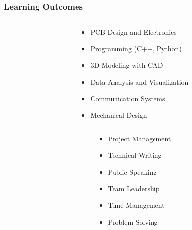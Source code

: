 \begin{frame}
\frametitle{Learning Outcomes}
\begin{columns}[T]
    \begin{column}{0.4\textwidth}
    \end{column}
    \begin{column}{0.6\textwidth}
        \begin{itemize}
            \item PCB Design and Electronics
            \item Programming (C++, Python)
            \item 3D Modeling with CAD
            \item Data Analysis and Visualization
            \item Communication Systems
            \item Mechanical Design
        \end{itemize}
    \end{column}
\end{columns}

\vspace{0.5cm}

\begin{columns}[T]
    \begin{column}{0.4\textwidth}
    \end{column}
    \begin{column}{0.6\textwidth}
        \begin{itemize}
            \item Project Management
            \item Technical Writing
            \item Public Speaking
            \item Team Leadership
            \item Time Management
            \item Problem Solving
        \end{itemize}
    \end{column}
\end{columns}
\end{frame}
